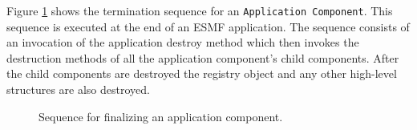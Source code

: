 Figure \ref{fig:ApplicationFinalizeSequence} shows the termination sequence
for an {\tt Application Component}. This sequence is executed at
the end of an ESMF application. The sequence consists of an invocation
of the application destroy method which then invokes the destruction methods 
of all the application component's child components. After the child 
components are destroyed the registry object and any other high-level 
structures are also destroyed.

\begin{figure}
\caption[{Application Finalize}]{Sequence for finalizing an application
component.\\}
\begin{center}
\label{fig:ApplicationFinalizeSequence}
\end{center}
\end{figure}

